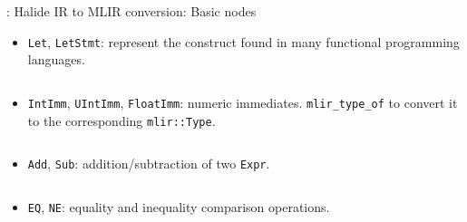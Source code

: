 \documentclass[8pt,a4paper,oneside,hidelinks,aspectratio=169,dvipsnames]{beamer}
\newcommand{\code}[1]{\texttt{\detokenize{#1}}}
\newcommand{\codecpp}[1]{\texttt{#1}}
\begin{document}
\begin{frame}{\code{CodeGen_MLIR}: Halide IR to MLIR conversion: Basic nodes}
  \begin{itemize}
    \item \codecpp{Let}, \codecpp{LetStmt}: represent the  construct found in many functional programming languages.
          \begin{figure}[H]
            \centering
            \begin{minipage}{0.355\textwidth}
              \inputminted[tabsize=2,frame=single,rulecolor=gray,fontsize=\fontsize{5}{5}]{cpp}{fig/let_conversion.cpp}
            \end{minipage}
          \end{figure}
    \item \codecpp{IntImm}, \codecpp{UIntImm}, \codecpp{FloatImm}: numeric immediates. \codecpp{mlir_type_of} to convert it to the corresponding \codecpp{mlir::Type}.
          \begin{figure}[H]
            \centering
            \begin{minipage}{0.46\textwidth}
              \inputminted[tabsize=2,frame=single,rulecolor=gray,fontsize=\fontsize{5}{5}]{cpp}{fig/immediate_conversion.cpp}
            \end{minipage}
          \end{figure}
    \item \codecpp{Add}, \codecpp{Sub}: addition/subtraction of two \codecpp{Expr}.
          \begin{figure}[H]
            \centering
            \begin{minipage}{0.55\textwidth}
              \inputminted[tabsize=2,frame=single,rulecolor=gray,fontsize=\fontsize{5}{5}]{cpp}{fig/add_conversion.cpp}
            \end{minipage}
          \end{figure}
    \item \codecpp{EQ}, \codecpp{NE}: equality and inequality comparison operations.
          \begin{figure}[H]
            \centering
            \begin{minipage}{0.55\textwidth}
              \inputminted[tabsize=2,frame=single,rulecolor=gray,fontsize=\fontsize{5}{5}]{cpp}{fig/eq_conversion.cpp}
            \end{minipage}
          \end{figure}
  \end{itemize}
\end{frame}
\end{document}
